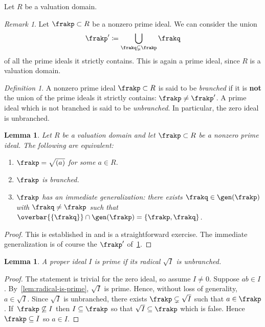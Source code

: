 \documentclass{amsart}
\numberwithin{equation}{section}%
\newtheorem{Lem}[equation]{Lemma}
\theoremstyle{remark}
\newtheorem{Def}[equation]{Definition}
\newtheorem{Rem}[equation]{Remark}
\newcounter{enum-resume-hack}
\begin{document}
Let $R$ be a valuation domain.

\begin{Rem}\label{rem:union-smaller-p}
	Let $\frakp \subset R$ be a nonzero prime ideal. We can consider the union
	\[
		\frakp'\coloneqq \bigcup_{\frakq \subsetneq \frakp} \frakq
	\]
	of all the prime ideals it strictly contains. This is again a prime ideal, since $R$ is a valuation domain.
\end{Rem}

\begin{Def}
	A nonzero prime ideal $\frakp \subset R$ is said to be \emph{branched} if it is \textbf{not} the union of the prime ideals it strictly contains: $\frakp \neq \frakp'$. A prime ideal which is not branched is said to be \emph{unbranched}. In particular, the zero ideal is unbranched.
\end{Def}

\begin{Lem}\label{lem:branch-equiv}
	Let $R$ be a valuation domain and let $\frakp \subset R$ be a nonzero prime ideal. The following are equivalent:
	\begin{enumerate}
		\item $\frakp = \sqrt{(a)}$ for some $a \in R$.
		\item $\frakp$ is branched.
		\item $\frakp$ has an immediate generalization: there exists $\frakq \in \gen(\frakp)$ with $\frakq\neq \frakp$ such that $\overbar{\{\frakq\}} \cap \gen(\frakp) = \{\frakp,\frakq\}$.
	\end{enumerate}
\end{Lem}

\begin{proof}
	This is established in \cite[Theorem~17.3]{Gilmer92} and is a straightforward exercise. The immediate generalization is of course the $\frakp'$ of~\cref{rem:union-smaller-p}.
\end{proof}

\begin{Lem}\label{lem:radical-unbranched}
	A proper ideal $I$ is prime if its radical $\sqrt{I}$ is unbranched.
\end{Lem}

\begin{proof}
	The statement is trivial for the zero ideal, so assume $I\neq 0$. Suppose $ab\in I$. By~\cref{lem:radical-is-prime}, $\sqrt{I}$ is prime. Hence, without loss of generality, $a \in \sqrt{I}$. Since $\sqrt{I}$ is unbranched, there exists $\frakp \subsetneq \sqrt{I}$ such that $a \in \frakp$. If~$\frakp \not\subseteq I$ then $I \subseteq \frakp$ so that $\sqrt{I} \subseteq \frakp$ which is false. Hence $\frakp \subseteq I$ so $a \in I$.
\end{proof}
\end{document}
